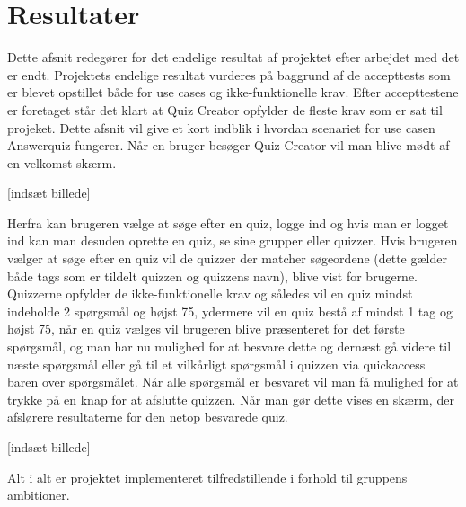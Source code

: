 \section{Resultater}
Dette afsnit redegører for det endelige resultat af projektet efter arbejdet med det er endt. Projektets endelige resultat vurderes på baggrund af de accepttests som er blevet opstillet både for use cases og ikke-funktionelle krav. Efter accepttestene er foretaget står det klart at Quiz Creator opfylder de fleste krav som er sat til projeket. Dette afsnit vil give et kort indblik i hvordan scenariet for use casen Answerquiz fungerer. Når en bruger besøger Quiz Creator vil man blive mødt af en velkomst skærm.

[indsæt billede]

Herfra kan brugeren vælge at søge efter en quiz, logge ind og hvis man er logget ind kan man desuden oprette en quiz, se sine grupper eller quizzer. Hvis brugeren vælger at søge efter en quiz vil de quizzer der matcher søgeordene (dette gælder både tags som er tildelt quizzen og quizzens navn), blive vist for brugerne. Quizzerne opfylder de ikke-funktionelle krav og således vil en quiz mindst indeholde 2 spørgsmål og højst 75, ydermere vil en quiz bestå af mindst 1 tag og højst 75, når en quiz vælges vil brugeren blive præsenteret for det første spørgsmål, og man har nu mulighed for at besvare dette og dernæst gå videre til næste spørgsmål eller gå til et vilkårligt spørgsmål i quizzen via quickaccess baren over spørgsmålet. Når alle spørgsmål er besvaret vil man få mulighed for at trykke på en knap for at afslutte quizzen. Når man gør dette vises en skærm, der afslørere resultaterne for den netop besvarede quiz.

[indsæt billede]

Alt i alt er projektet implementeret tilfredstillende i forhold til gruppens ambitioner. 

